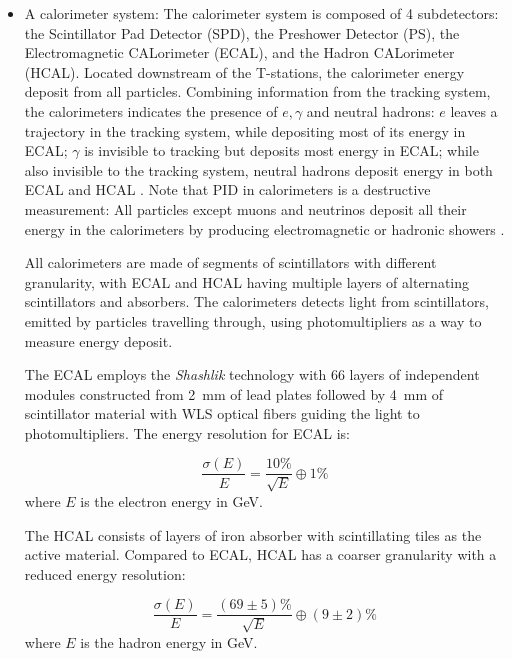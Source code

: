 \begin{itemize}
    \item A calorimeter system:
        The calorimeter system is composed of 4 subdetectors:
        the Scintillator Pad Detector (SPD), the Preshower Detector (PS),
        the Electromagnetic CALorimeter (ECAL),
        and the Hadron CALorimeter (HCAL).
        Located downstream of the T-stations, the calorimeter energy deposit
        from all particles.
        Combining information from the tracking system,
        the calorimeters indicates the presence of $e, \gamma$ and neutral
        hadrons:
        $e$ leaves a trajectory in the tracking system, while depositing most
        of its energy in ECAL;
        $\gamma$ is invisible to tracking but deposits most energy in ECAL;
        while also invisible to the tracking system,
        neutral hadrons deposit energy in both ECAL and HCAL
        \cite{Belyaev_2021}.
        Note that PID in calorimeters is a destructive measurement:
        All particles except muons and neutrinos deposit all their energy
        in the calorimeters by producing electromagnetic or hadronic showers
        \cite{Lippmann_2012}.

        All calorimeters are made of segments of scintillators with different
        granularity,
        with ECAL and HCAL having multiple layers of alternating scintillators
        and absorbers.
        The calorimeters detects light from scintillators,
        emitted by particles travelling through,
        using photomultipliers as a way to measure energy deposit.

        The ECAL employs the \emph{Shashlik} technology with 66 layers of
        independent modules constructed from 2~mm of lead plates
        followed by 4~mm of scintillator material with WLS optical fibers
        guiding the light to photomultipliers.
        The energy resolution for ECAL is:

        \begin{equation}
            \frac{\sigma(E)}{E} = \frac{10\%}{\sqrt{E}} \oplus 1\%
        \end{equation}
        where $E$ is the electron energy in GeV.

        The HCAL consists of layers of iron absorber with scintillating tiles as
        the active material.
        Compared to ECAL, HCAL has a coarser granularity with a reduced
        energy resolution:

        \begin{equation}
            \frac{\sigma(E)}{E} = \frac{(69 \pm 5)\%}{\sqrt{E}} \oplus
            (9 \pm 2)\%
        \end{equation}
        where $E$ is the hadron energy in GeV.


\end{itemize}
